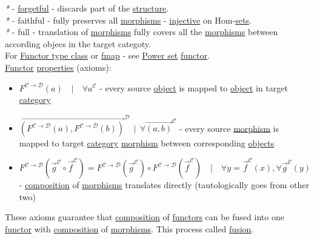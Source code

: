 \documentclass[a4paper,14pt,oneside]{book}
\begin{document}
\emph{*} - \hyperref[orge878602]{forgetful} - discards part of the \hyperref[orgffe6855]{structure}.\\
\emph{*} - faithful - fully preserves all \hyperref[orgb352465]{morphisms} - \hyperref[org01622cd]{injective} on Hom-\hyperref[orgcfe0436]{sets}.\\
\emph{*} - full - translation of \hyperref[orgb352465]{morphisms} fully covers all the \hyperref[orgb352465]{morphisms} between according objecs in the target categoty.\\

For \hyperref[orgcf43743]{Functor type class} or \hyperref[orgd75179a]{fmap} - see \hyperref[orgb767f84]{Power set} \hyperref[orgd17eb6d]{functor}.\\

\hyperref[orgd17eb6d]{Functor} \hyperref[orge0a1a8a]{properties} (axioms):\\
\begin{itemize}
\item \(F^{\mathcal{C \to D}}(a) \quad | \quad \forall a^{\mathcal{C}}\) - every source \hyperref[org65d2cb0]{object} is mapped to \hyperref[org65d2cb0]{object} in target \hyperref[org3a5c6d7]{category}\\
\item \(\overrightarrow{(F^{\mathcal{C \to D}}(a),F^{\mathcal{C \to D}}(b))}^{\mathcal{D}} \ \ | \ \ \forall \overrightarrow{(a, b)}^{\mathcal{C}}\) - every source \hyperref[orgc908564]{morphism} is mapped to target \hyperref[org3a5c6d7]{category} \hyperref[orgc908564]{morphism} between corresponding \hyperref[org67f2abd]{objects}\\
\item \(F^{\mathcal{C \to D}}(\overrightarrow{g}^{\mathcal{C}} \circ \overrightarrow{f}^{\mathcal{C}}) = F^{\mathcal{C \to D}}(\overrightarrow{g}^{\mathcal{C}}) \circ F^{\mathcal{C \to D}}(\overrightarrow{f}^{\mathcal{C}}) \quad | \quad \forall y=\overrightarrow{f}^{\mathcal{C}}(x), \forall \overrightarrow{g}^{\mathcal{C}}(y)\) - \hyperref[org309d77e]{composition} of \hyperref[orgb352465]{morphisms} translates directly (tautologically goes from other two)\\
\end{itemize}

These axioms guarantee that \hyperref[org309d77e]{composition} of \hyperref[org8f42943]{functors} can be fused into one \hyperref[orgd17eb6d]{functor} with \hyperref[org309d77e]{composition} of \hyperref[orgb352465]{morphisms}. This process called \hyperref[org6681073]{fusion}.\\
\end{document}

